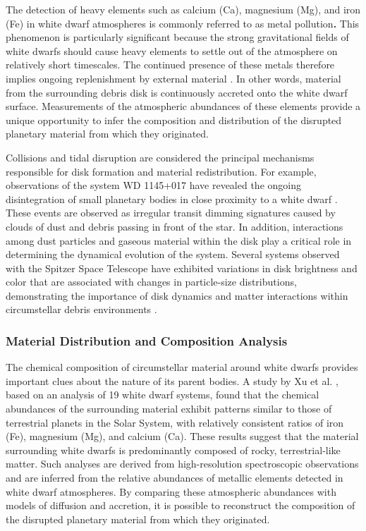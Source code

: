 The detection of heavy elements such as calcium (Ca), magnesium (Mg), and iron (Fe) in white dwarf atmospheres is commonly referred to as metal pollution\textbf{.} This phenomenon is particularly significant because the strong gravitational fields of white dwarfs should cause heavy elements to settle out of the atmosphere on relatively short timescales. The continued presence of these metals therefore implies ongoing replenishment by external material \cite{koester2014,farihi2010}. In other words, material from the surrounding debris disk is continuously accreted onto the white dwarf surface. Measurements of the atmospheric abundances of these elements provide a unique opportunity to infer the composition and distribution of the disrupted planetary material from which they originated.

Collisions and tidal disruption are considered the principal mechanisms responsible for disk formation and material redistribution. For example, observations of the system WD 1145+017 have revealed the ongoing disintegration of small planetary bodies in close proximity to a white dwarf \cite{vanderburg2015}. These events are observed as irregular transit dimming signatures caused by clouds of dust and debris passing in front of the star. In addition, interactions among dust particles and gaseous material within the disk play a critical role in determining the dynamical evolution of the system. Several systems observed with the Spitzer Space Telescope have exhibited variations in disk brightness and color that are associated with changes in particle-size distributions, demonstrating the importance of disk dynamics and matter interactions within circumstellar debris environments \cite{xu2018}.

\subsubsection{Material Distribution and Composition Analysis}

The chemical composition of circumstellar material around white dwarfs provides important clues about the nature of its parent bodies. A study by Xu et al. \cite{xu2019}, based on an analysis of 19 white dwarf systems, found that the chemical abundances of the surrounding material exhibit patterns similar to those of terrestrial planets in the Solar System, with relatively consistent ratios of iron (Fe), magnesium (Mg), and calcium (Ca). These results suggest that the material surrounding white dwarfs is predominantly composed of rocky, terrestrial-like matter. Such analyses are derived from high-resolution spectroscopic observations and are inferred from the relative abundances of metallic elements detected in white dwarf atmospheres. By comparing these atmospheric abundances with models of diffusion and accretion, it is possible to reconstruct the composition of the disrupted planetary material from which they originated.

